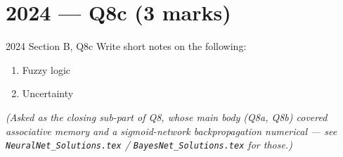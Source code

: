 \documentclass[12pt,a4paper]{article}
\begin{document}
\newpage
\section{2024 --- Q8c (3 marks)}

\begin{qbox}{2024 Section B, Q8c}
Write short notes on the following:
\begin{enumerate}[label=\roman*)]
  \item Fuzzy logic
  \item Uncertainty
\end{enumerate}
\textit{(Asked as the closing sub-part of Q8, whose main body (Q8a, Q8b) covered associative memory and a sigmoid-network backpropagation numerical --- see \texttt{NeuralNet\_Solutions.tex} / \texttt{BayesNet\_Solutions.tex} for those.)}
\end{qbox}
\end{document}

